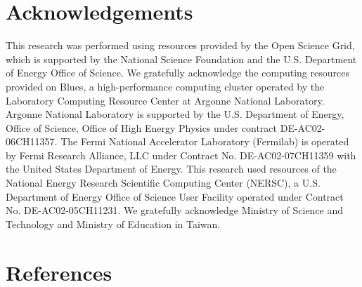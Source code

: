 \documentclass[final,1p,11pt]{elsarticle}
\begin{document}
\section*{Acknowledgements}
This research was performed using resources provided by the Open Science Grid,
which is supported by the National Science Foundation and the U.S. Department of Energy Office of Science. 
We gratefully acknowledge the computing resources provided on Blues, 
a high-performance computing cluster operated by the Laboratory Computing Resource Center at Argonne National Laboratory.
Argonne National Laboratory is supported by the U.S. Department of Energy, Office of Science, Office of High Energy Physics  under contract DE-AC02-06CH11357. The Fermi National Accelerator Laboratory (Fermilab) is operated by Fermi Research Alliance, LLC under Contract No. DE-AC02-07CH11359 with the United States Department of Energy.
This research used resources of the National Energy Research Scientific  Computing Center (NERSC), a U.S. Department of Energy Office of Science  User Facility operated under Contract No. DE-AC02-05CH11231. We gratefully acknowledge Ministry of Science and Technology and Ministry of Education in Taiwan.

\newpage
\section*{References}


\def\bibname{\Large\bf References}
\def\refname{\Large\bf References}
\pagestyle{plain}

\end{document}
